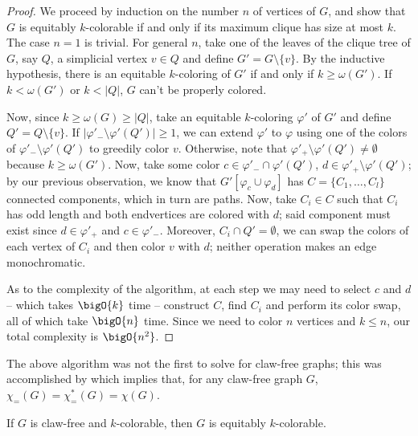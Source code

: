\begin{proof}
    We proceed by induction on the number $n$ of vertices of $G$, and show that $G$ is equitably $k$-colorable if and only if its maximum clique has size at most $k$.
    The case $n = 1$ is trivial.
    For general $n$, take one of the leaves of the clique tree of $G$, say $Q$, a simplicial vertex $v \in Q$ and define $G' = G \setminus \{v\}$.
    By the inductive hypothesis, there is an equitable $k$-coloring of $G'$ if and only if $k \geq \omega(G')$.
    If $k < \omega(G')$ or $k < |Q|$, $G$ can't be properly colored.
    
    Now, since $k \geq \omega(G) \geq |Q|$, take an equitable $k$-coloring $\varphi'$ of $G'$ and define $Q' = Q \setminus \{v\}$.
    If $|\varphi'_- \setminus \varphi'(Q')| \geq 1$, we can extend $\varphi'$ to $\varphi$ using one of the colors of $\varphi'_- \setminus \varphi'(Q')$ to greedily color $v$.
    Otherwise, note that $\varphi'_+ \setminus \varphi'(Q') \neq \emptyset$ because $k \geq \omega(G')$.
    Now, take some color $c \in \varphi'_- \cap \varphi'(Q')$, $d \in \varphi'_+ \setminus \varphi'(Q')$; by our previous observation, we know that $G'[\varphi_c \cup \varphi_d]$ has $C = \{C_1, \dots, C_l\}$ connected components, which in turn are paths.
    Now, take $C_i \in C$ such that $C_i$ has odd length and both endvertices are colored with $d$; said component must exist since $d \in \varphi'_+$ and $c \in \varphi'_-$.
    Moreover, $C_i \cap Q' = \emptyset$, we can swap the colors of each vertex of $C_i$ and then color $v$ with $d$; neither operation makes an edge monochromatic.
    
    As to the complexity of the algorithm, at each step we may need to select $c$ and $d$ -- which takes $\bigO{k}$ time -- construct $C$, find $C_i$ and perform its color swap, all of which take $\bigO{n}$ time.
    Since we need to color $n$ vertices and $k \leq n$, our total complexity is $\bigO{n^2}$.
\end{proof}

The above algorithm was not the first to solve  for claw-free graphs; this was accomplished by \cite{claw_free_de_werra} which implies that, for any claw-free graph $G$, $\chi_=(G) = \chi_=^*(G) = \chi(G)$.

\begin{theorem}
    If $G$ is claw-free and $k$-colorable, then $G$ is equitably $k$-colorable.
\end{theorem}

